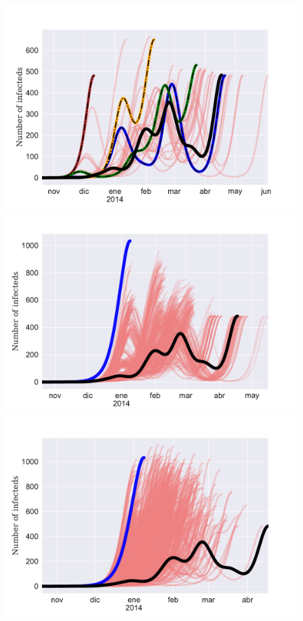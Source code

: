 \documentclass[11pt]{article}
\begin{document}
\begin{figure}[ht]
\centering
\includegraphics[scale=.45]{./scenario4_scenarioB-3}
\includegraphics[scale=.30]{./scenario_A_2peak_2}
\includegraphics[scale=.30]{./scenario_ER_network_2}

\end{figure}
\end{document}
